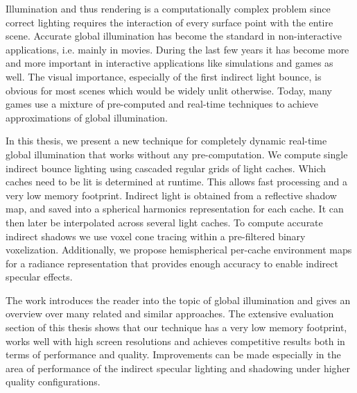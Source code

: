 \documentclass[thesis.tex]{subfiles}
\begin{document}

Illumination and thus rendering is a computationally complex problem since correct lighting requires the interaction of every surface point with the entire scene.
Accurate global illumination has become the standard in non-interactive applications, i.e. mainly in movies.
During the last few years it has become more and more important in interactive applications like simulations and games as well.
The visual importance, especially of the first indirect light bounce, is obvious for most scenes which would be widely unlit otherwise.
Today, many games use a mixture of pre-computed and real-time techniques to achieve approximations of global illumination.

In this thesis, we present a new technique for completely dynamic real-time global illumination that works without any pre-computation.
We compute single indirect bounce lighting using cascaded regular grids of light caches.
Which caches need to be lit is determined at runtime.
This allows fast processing and a very low memory footprint.
Indirect light is obtained from a reflective shadow map, and saved into a spherical harmonics representation for each cache.
It can then later be interpolated across several light caches.
To compute accurate indirect shadows we use voxel cone tracing within a pre-filtered binary voxelization.
Additionally, we propose hemispherical per-cache environment maps for a radiance representation that provides enough accuracy to enable indirect specular effects.

The work introduces the reader into the topic of global illumination and gives an overview over many related and similar approaches.
The extensive evaluation section of this thesis shows that our technique has a very low memory footprint, works well with high screen resolutions and achieves competitive results both in terms of performance and quality.
Improvements can be made especially in the area of performance of the indirect specular lighting and shadowing under higher quality configurations.
\end{document}
